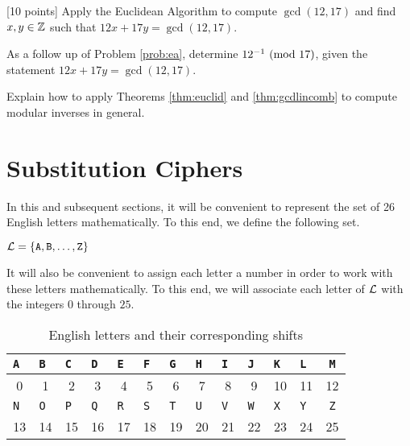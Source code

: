 \begin{problem}
\label{prob:ea} [10 points]
Apply the Euclidean Algorithm to compute $\gcd(12, 17)$ and find $x, y\in\mathbb{Z}$ such that $12x+17y=\gcd(12, 17)$.
\end{problem}

\begin{problem} [10 points]
As a follow up of Problem \ref{prob:ea}, determine $12^{-1}\mbox{\ $\left(\mathrm{mod}\ {17}\right)$}$, given the statement $12x+17y=\gcd(12, 17)$.
\end{problem}

\begin{problem} [10 points]
Explain how to apply Theorems \ref{thm:euclid} and \ref{thm:gcdlincomb} to compute modular inverses in general.
\end{problem}





	\section{Substitution Ciphers}
	\label{ssec:sub}
		In this and subsequent sections, it will be convenient to represent the set of 26 English letters mathematically. To this end, we define the following set.

	\begin{definition} $\mathcal{L} = \{\tt{A}, \tt{B}, \ldots, \tt{Z}\}$ \end{definition}

It will also be convenient to assign each letter a number in order to work with these letters mathematically. To this end, we will associate each letter of $\mathcal{L}$ with the integers $0$ through $25$.

\begin{table}[h!]
\begin{center}
\begin{tabular}{|c|c|c|c|c|c|c|c|c|c|c|c|c|}
\hline
\tt{A} & \tt{B} &\tt{C} & \tt{D} &\tt{E} & \tt{F} &\tt{G} & \tt{H} &\tt{I} & \tt{J} &\tt{K} & \tt{L} & \tt{M}\\
\hline
0 &1 & 2& 3& 4&5&6&7&8&9&10&11&12\\
\hline
\hline
\tt{N} & \tt{O} &\tt{P} & \tt{Q} &\tt{R} & \tt{S} &\tt{T} & \tt{U} &\tt{V} & \tt{W} &\tt{X} & \tt{Y} & \tt{Z}\\
\hline
13 &14 & 15& 16& 17&18&19&20&21&22&23&24&25\\
\hline
\end{tabular}
\end{center}
\caption{English letters and their corresponding shifts}
\label{table:lnums}
\end{table}

